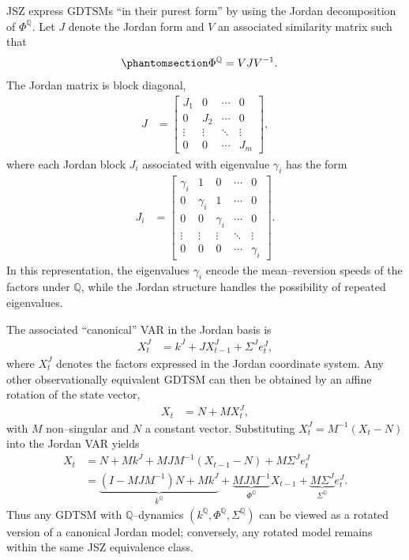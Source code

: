 \documentclass[
  letterpaper,
  DIV=11,
  numbers=noendperiod]{scrreprt}
\begin{document}
JSZ express GDTSMs ``in their purest form'' by using the Jordan
decomposition of \(\Phi^{\mathbb{Q}}\). Let \(J\) denote the Jordan form
and \(V\) an associated similarity matrix such that
\begin{equation}\protect\phantomsection\label{eq-JSZ-Jordan}{
\begin{align}
\Phi^{\mathbb{Q}} &= V J V^{-1}.
\end{align}
}\end{equation} The Jordan matrix is block diagonal,
\begin{align}
J &=
\begin{bmatrix}
J_1    & 0      & \cdots & 0      \\
0      & J_2    & \cdots & 0      \\
\vdots & \vdots & \ddots & \vdots \\
0      & 0      & \cdots & J_m
\end{bmatrix},
\end{align}
where each Jordan block \(J_i\) associated with eigenvalue \(\gamma_i\)
has the form
\begin{align}
J_i
&=
\begin{bmatrix}
\gamma_i & 1       & 0       & \cdots & 0      \\
0        & \gamma_i & 1      & \cdots & 0      \\
0        & 0       & \gamma_i & \cdots & 0      \\
\vdots   & \vdots  & \vdots  & \ddots & \vdots \\
0        & 0       & 0       & \cdots & \gamma_i
\end{bmatrix}.
\end{align}
In this representation, the eigenvalues \(\gamma_i\) encode the
mean--reversion speeds of the factors under \(\mathbb{Q}\), while the
Jordan structure handles the possibility of repeated eigenvalues.

The associated ``canonical'' VAR in the Jordan basis is
\begin{align}
X_t^{J} &= k^{J} + J X_{t-1}^{J} + \Sigma^{J} e_t^{J},
\end{align}
where \(X_t^{J}\) denotes the factors expressed in the Jordan coordinate
system. Any other observationally equivalent GDTSM can then be obtained
by an affine rotation of the state vector,
\begin{align}
X_t &= N + M X_t^{J},
\end{align}
with \(M\) non--singular and \(N\) a constant vector. Substituting
\(X_t^{J} = M^{-1}(X_t-N)\) into the Jordan VAR yields
\begin{align}
X_t
&= N + M k^{J} + M J M^{-1} (X_{t-1} - N) + M \Sigma^{J} e_t^{J} \nonumber \\
&= \underbrace{\left( I - M J M^{-1} \right)N + M k^{J}}_{k^{\mathbb{Q}}}
    + \underbrace{M J M^{-1}}_{\Phi^{\mathbb{Q}}} X_{t-1}
    + \underbrace{M \Sigma^{J}}_{\Sigma^{\mathbb{Q}}} e_t^{J}.
\end{align}
Thus any GDTSM with \(\mathbb{Q}\)--dynamics
\((k^{\mathbb{Q}},\Phi^{\mathbb{Q}},\Sigma^{\mathbb{Q}})\) can be viewed
as a rotated version of a canonical Jordan model; conversely, any
rotated model remains within the same JSZ equivalence class.
\end{document}
